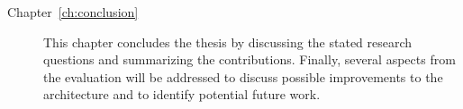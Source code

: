 \documentclass[../../main.tex]{subfiles}
\begin{document}
\begin{description}
    \item[Chapter~\ref{ch:conclusion}] This chapter concludes the thesis by discussing the stated research questions and summarizing the contributions. Finally, several aspects from the evaluation will be addressed to discuss possible improvements to the architecture and to identify potential future work.
\end{description}
\end{document}
